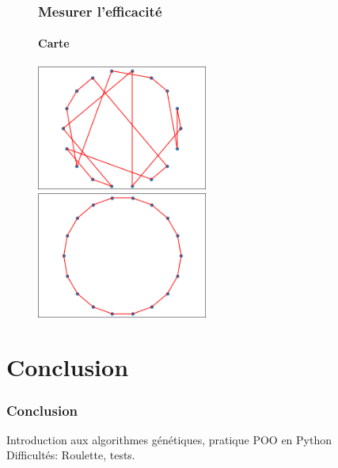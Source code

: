 \documentclass[16pt]{beamer}
\begin{document}
\begin{frame}
  \begin{figure}
  \frametitle{Mesurer l'efficacité}
  \framesubtitle{Carte}
    \includegraphics[width=0.5\textwidth]{gen1.png}
    \includegraphics[width=0.5\textwidth]{gen200.png}
  \end{figure}
\end{frame}

\section{Conclusion}

\begin{frame}
  \frametitle{Conclusion}
  \pause{}
  Introduction aux algorithmes génétiques, pratique POO en Python \pause{} \\
  Difficultés: Roulette, tests.
\end{frame}
\end{document}
